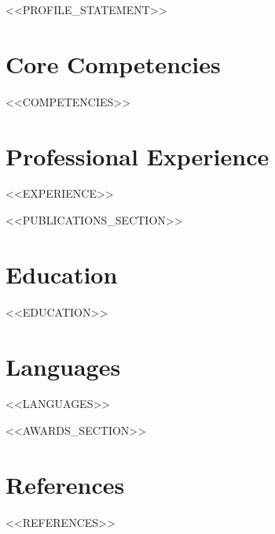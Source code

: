 \documentclass[11pt,a4paper,sans]{moderncv}
\begin{document}
\makecvtitle

\vspace{6pt}
\small{<<PROFILE_STATEMENT>>}

\section{Core Competencies}
\vspace{1pt}
\begin{itemize}
<<COMPETENCIES>>
\end{itemize}

\section{Professional Experience}
\vspace{3pt}
\begin{itemize}
<<EXPERIENCE>>
\end{itemize}

<<PUBLICATIONS_SECTION>>

\section{Education}
\vspace{1pt}
\begin{itemize}
<<EDUCATION>>
\end{itemize}

\section{Languages}
\vspace{1pt}
\begin{itemize}
<<LANGUAGES>>
\end{itemize}

<<AWARDS_SECTION>>

\section{References}
\vspace{1pt}
\begin{itemize}
<<REFERENCES>>
\end{itemize}
\end{document}
